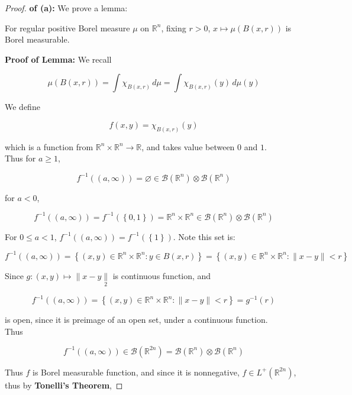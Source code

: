 \begin{proof}

\textbf{of (a):} We prove a lemma:

\begin{lemma}

For regular positive Borel measure \(\mu\) on \(\mathbb{R}^{n}\), fixing \(r > 0\), \(x\mapsto\mu(B(x,r))\) is Borel measurable.

\end{lemma}

\textbf{Proof of Lemma:} We recall

\[\mu(B(x,r)) = \int\chi_{B(x,r)}\, d\mu = \int\chi_{B(x,r)}(y)\, d\mu(y)\]

We define

\[f(x,y) = \chi_{B(x,r)}(y)\]

which is a function from \(\mathbb{R}^{n} \times \mathbb{R}^{n}\rightarrow\mathbb{R}\), and takes value between \(0\) and \(1\).\\
Thus for \(a \geq 1\),

\[f^{- 1}((a,\infty)) = \varnothing \in \mathcal{B}(\mathbb{R}^{n}) \otimes \mathcal{B}(\mathbb{R}^{n})\]

for \(a < 0\),

\[f^{- 1}((a,\infty)) = f^{- 1}(\left\{ {0,1} \right\}) = \mathbb{R}^{n} \times \mathbb{R}^{n} \in \mathcal{B}(\mathbb{R}^{n}) \otimes \mathcal{B}(\mathbb{R}^{n})\]

For \(0 \leq a < 1\), \(f^{- 1}((a,\infty)) = f^{- 1}(\left\{ 1 \right\})\). Note this set is:

\[f^{- 1}((a,\infty)) = \left\{ {(x,y) \in \mathbb{R}^{n} \times \mathbb{R}^{n}:y \in B(x,r)} \right\} = \left\{ {(x,y) \in \mathbb{R}^{n} \times \mathbb{R}^{n}: \parallel x - y \parallel < r} \right\}\]

Since \(g:(x,y)\mapsto \parallel x - y\underset{2}{\parallel}\) is continuous function, and

\[f^{- 1}((a,\infty)) = \left\{ {(x,y) \in \mathbb{R}^{n} \times \mathbb{R}^{n}: \parallel x - y \parallel < r} \right\} = g^{- 1}(r)\]

is open, since it is preimage of an open set, under a continuous function.\\
Thus

\[f^{- 1}((a,\infty)) \in \mathcal{B}(\mathbb{R}^{2n}) = \mathcal{B}(\mathbb{R}^{n}) \otimes \mathcal{B}(\mathbb{R}^{n})\]

Thus \(f\) is Borel measurable function, and since it is nonnegative, \(f \in L^{+}(\mathbb{R}^{2n})\), thus by \textbf{Tonelli's Theorem},


\end{proof}
